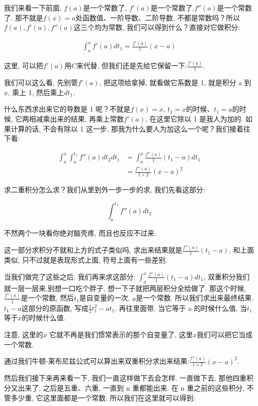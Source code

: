 我们来看一下前面, $f(a)$是一个常数了, $f'(a)$是一个常数了,$f''(a)$是一个常数了. 那不就是$f(x) = a$处函数值、一阶导数、二阶导数, 不都是常数吗？所以$f(a), f'(a), f''(a)$这三个均为常数, 我们可以得到什么？直接对它做积分: 

\begin{align*}
\int_a^xf'(a)dt_1 = \frac{f'(a)}{1}(x-a)
\end{align*}

这里, 可以把$f'(a)$用$C$来代替, 但我们还是先给它保留一下:$\frac{f'(a)}{1}$. 

我们可以这么看, 先别管$f'(a)$, 把这项给拿掉, 就看做它系数是 1, 就是积分 a 到$x$, 乘上 1,  然后乘上$dt_1$. 

什么东西求出来它的导数是 1 呢？不就是$f(x) = x$, $t_1 = x$的时候、$t_1 = a$的时候, 它两相减乘出来的结果, 再乘上常数$f'(a)$, 在这里它除以 1 是我人为加的. 如果计算的话, 不会有除以 1 这一步, 那我为什么要人为加这么一个呢？我们接着往下看:

\begin{align*}
  \int_a^x\int_a^{t_1}f''(a)dt_2dt_1 & = \int_a^x \frac{f''(a)}{1}(t_1 - a)dt_1 \\
  & = \frac{f''(a)}{1 \times 2}(x-a)^2
\end{align*}

求二重积分怎么求？我们从里到外一步一步的求, 我们先看这部分: 

\[\int_a^{t_1}f''(a)dt_2\]

不然两个一块看你绝对脑壳疼, 而且也反应不过来. 

这一部分求积分不就和上方的式子类似吗, 求出来结果就是$\frac{f''(a)}{1}(t_1 - a)$, 和上面类似, 只不过就是表现形式上面, 符号上面有一些差别. 

当我们做完了这些之后, 我们再来求这部分: $\int_a^x \frac{f''(a)}{1}(t_1 - a)dt_1$, 双重积分我们就一层一层来,别想一口吃个胖子, 想一下子就把两层积分全给做了. 那这个时候, $\frac{f''(a)}{1}$是一个常数, 然后$t_1$是自变量的一次, $a$是一个常数. 所以我们求出来最终结果. $t_1-a$这部分的原函数, 写成$\frac{1}{2}t_1^2 - at_1$. 再往里面带, 当它等于 a 的时候什么值, 当$t_1$等于$x$的时候什么值. 

注意, 这里的$x$ 它就不再是我们惯常表示的那个自变量了, 这里$x$我们可以把它当成一个常数. 

通过我们牛顿-莱布尼兹公式可以算出来双重积分求出来结果:$\frac{f''(a)}{1 \times 2}(x-a)^2$. 

然后我们接下来再来看一下, 我们一直这样做下去会怎样. 一直做下去, 那他四重积分又出来了, 之后是五重、六重, 一直到 n 重都能出来. 在 n 重之前的这些积分, 不管多少重, 它这里面都是一个常数. 所以我们在这里就可以得到: 

